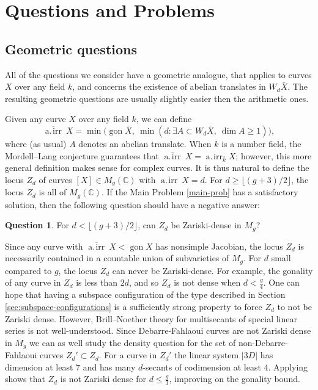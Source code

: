\documentclass[11pt]{amsart}
\newcommand{\cc}{\mathbb{C}}
\newcommand{\airr}{\operatorname{a.\!irr}}
\newcommand{\gairr}{\overline{\operatorname{a.\!irr}}\ }
\newcommand{\gon}{\operatorname{gon}}
\theoremstyle{definition}
\newtheorem{question}[theorem]{Question}
\theoremstyle{remark}
\begin{document}
\section{Questions and Problems}\label{sec:questions}

\subsection{Geometric questions}\label{sec:geometric-questions}

All of the questions we consider have a geometric analogue, that applies to curves $X$ over any field $k$, and concerns the existence of abelian translates in $W_d \bar{X}$. The resulting geometric questions are usually slightly easier then the arithmetic ones.

Given any curve \(X\) over any field \(k\), we can define
\[\gairr X = \min\big( \gon \bar{X}, \ \min(d \colon \exists A \subset W_d\bar{X}, \ \dim A \geqslant 1)\big),\]
where (as usual) \(A\) denotes an abelian translate.  When \(k\) is a number field, the Mordell--Lang conjecture guarantees that 
\(\gairr X = \airr_{\bar{k}}X\); however, this more general definition makes sense for complex curves.  It is thus natural to define the locus \(Z_d\) of curves \([X ]\in M_g(\cc)\) with \(\gairr X = d\).  For \(d \geqslant \lfloor (g+3)/2 \rfloor\), the locus \(Z_d\) is all of \(M_g(\cc)\).  If the Main Problem \ref{main-prob} has a satisfactory solution, then the following question should have a negative answer:

\begin{question}
For \(d < \lfloor (g+3)/2 \rfloor\), can \(Z_d\) be Zariski-dense in \(M_g\)? 
\end{question}

Since any curve with \(\gairr X < \gon X\) has nonsimple Jacobian, the locus \(Z_d\) is necessarily contained in a countable union of subvarieties of \(M_g\).
For \(d\) small compared to \(g\), the locus \(Z_d\) can never be Zariski-dense. For example, the gonality of any curve in \(Z_d\) is less than $2d$, and so $Z_d$ is not dense when $d < \frac{g}{4}$. One can hope that having a subspace configuration of the type described in Section \ref{sec:subspace-configurations} is a sufficiently strong property to force $Z_d$ to not be Zariski dense. However, Brill--Noether theory for multisecants of special linear series is not well-understood. Since Debarre-Fahlaoui curves are not Zariski dense in $M_g$ we can as well study the density question for the set of non-Debarre-Fahlaoui curves $Z_d' \subset Z_d$. For a curve in $Z_d'$ the linear system $|3D|$ has dimension at least $7$ and has many $d$-secants of codimension at least \(4\). Applying \cite[Theorem 1]{farkas2008higher} shows that $Z_d$ is not Zariski dense for $d\leq \frac{g}{3}$, improving on the gonality bound. 
\end{document}
